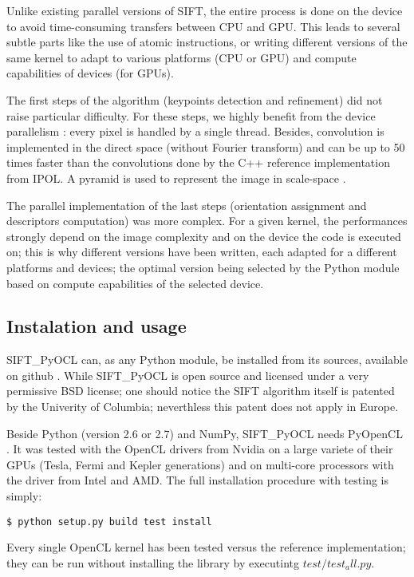 \documentclass[preprint]{iucr}
\begin{document}
Unlike existing parallel versions of SIFT\cite{lu,rister,vasilyev}, the entire
process is done on the device to avoid time-consuming transfers between CPU and
GPU. 
This leads to several subtle parts like the use of atomic instructions, or writing 
different versions of the same kernel to adapt to various platforms (CPU or
GPU) and compute capabilities of devices (for GPUs).

The first steps of the algorithm (keypoints detection and refinement) did not 
raise particular difficulty. 
For these steps, we highly benefit from the device parallelism : every pixel 
is handled by a single thread. 
Besides, convolution is implemented in the direct space (without Fourier
transform) and can be up to 50 times faster than the convolutions done by the
C++ reference implementation from IPOL.  
A pyramid is used to represent the image in scale-space \cite{Lowe04}.

The parallel implementation of the last steps (orientation assignment and 
descriptors computation) was more complex. 
For a given kernel, the performances strongly depend on the image
complexity and on the device the code is executed on; this is why different
versions have been written, each adapted for a different platforms and devices; 
the optimal version being selected by the
Python module based on compute capabilities of the selected device.


\subsection{Instalation and usage}
SIFT\_PyOCL can, as any Python module, be installed from its sources,
available on github \cite{sift_pyocl}.
While SIFT\_PyOCL is open source and licensed under a very
permissive BSD license; one should notice the SIFT algorithm itself is
patented by the Univerity of Columbia\cite{SIFT_pat}; neverthless this patent does
not apply in Europe.

Beside Python (version 2.6 or 2.7) and NumPy, SIFT\_PyOCL needs
PyOpenCL \cite{pyopencl}.
It was tested with the OpenCL drivers from Nvidia on a
large variete of their GPUs (Tesla, Fermi and Kepler generations) and on
multi-core processors with the driver from Intel and AMD. 
The full installation procedure with testing is simply:
\begin{verbatim}
$ python setup.py build test install
\end{verbatim}
Every single OpenCL kernel has been tested versus the reference
implementation; they can be run without installing the library by
executintg $test/test_all.py$. 
\end{document}
